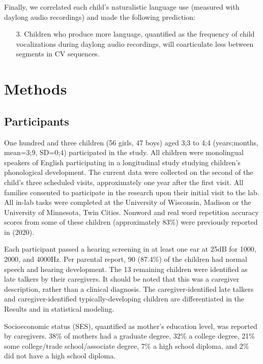 \documentclass[a4paper,man,natbib,donotrepeattitle, apacite]{apa6}
\begin{document}
Finally, we correlated each child’s naturalistic language use (measured with daylong audio recordings) and made the following prediction:

\begin{enumerate}
\item[3.] Children who produce more language, quantified as the frequency of child vocalizations during daylong audio recordings, will coarticulate less between segments in CV sequences.
\end{enumerate}

\section{Methods}

\subsection{Participants}

One hundred and three children (56 girls, 47 boys) aged 3;3 to 4;4 (years;months, mean=3;9, SD=0;4) participated in the study. All children were monolingual speakers of English participating in a longitudinal study studying children’s phonological development. The current data were collected on the second of the child’s three scheduled visits, approximately one year after the first visit. All families consented to participate in the research upon their initial visit to the lab. All in-lab tasks were completed at the University of Wisconsin, Madison or the University of Minnesota, Twin Cities. Nonword and real word repetition accuracy scores from some of these children (approximately 83\%) were previously reported in \citeauthor{cychoszLexicalAdvantageFouryearold2020} (2020).

Each participant passed a hearing screening in at least one ear at 25dB for 1000, 2000, and 4000Hz. Per parental report, 90 (87.4\%) of the children had normal speech and hearing development. The 13 remaining children were identified as late talkers by their caregivers. It should be noted that this was a caregiver description, rather than a clinical diagnosis. The caregiver-identified late talkers and caregiver-identified typically-developing children are differentiated in the Results and in statistical modeling. 

Socioeconomic status (SES), quantified as mother’s education level, was reported by caregivers. 38\% of mothers had a graduate degree, 32\% a college degree, 21\% some college/trade school/associate degree, 7\% a high school diploma, and 2\% did not have a high school diploma. 
\end{document}
